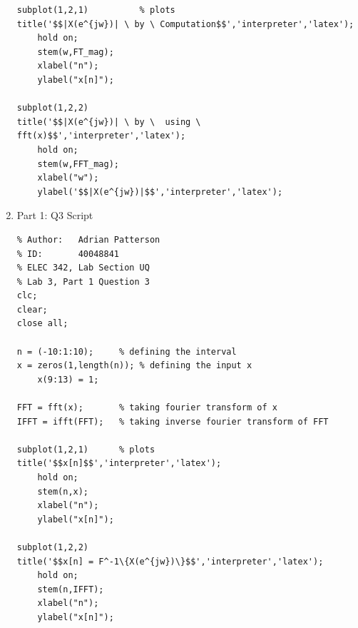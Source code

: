 \documentclass{article}
\begin{document}
\begin{enumerate}
\begin{verbatim}
subplot(1,2,1)          % plots
title('$$|X(e^{jw})| \ by \ Computation$$','interpreter','latex');
    hold on;
    stem(w,FT_mag);
    xlabel("n");
    ylabel("x[n]");

subplot(1,2,2)
title('$$|X(e^{jw})| \ by \  using \ fft(x)$$','interpreter','latex');
    hold on;
    stem(w,FFT_mag);
    xlabel("w");
    ylabel('$$|X(e^{jw})|$$','interpreter','latex');
        \end{verbatim}
        \vspace{.5cm}
        
    \item Part 1: Q3 Script
        \begin{verbatim}
% Author:   Adrian Patterson
% ID:       40048841
% ELEC 342, Lab Section UQ
% Lab 3, Part 1 Question 3
clc;
clear;
close all;

n = (-10:1:10);     % defining the interval
x = zeros(1,length(n)); % defining the input x
    x(9:13) = 1;
   
FFT = fft(x);       % taking fourier transform of x
IFFT = ifft(FFT);   % taking inverse fourier transform of FFT

subplot(1,2,1)      % plots
title('$$x[n]$$','interpreter','latex');
    hold on;
    stem(n,x);
    xlabel("n");
    ylabel("x[n]");

subplot(1,2,2)
title('$$x[n] = F^-1\{X(e^{jw})\}$$','interpreter','latex');
    hold on;
    stem(n,IFFT);
    xlabel("n");
    ylabel("x[n]");
        \end{verbatim}
        \vspace{.5cm}
        
 
\end{enumerate}
\end{document}
